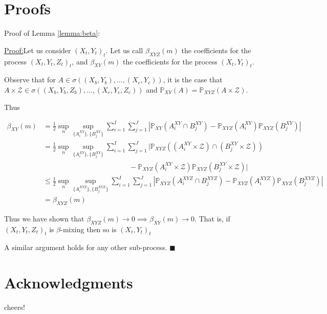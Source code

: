 \documentclass{article}
\newenvironment{claimproof}[1]{\par\noindent\underline{Proof:}\space#1}{\hfill $\blacksquare$}
\begin{document}
\section{Proofs}
Proof of Lemma \ref{lemma:beta}:
\begin{claimproof} Let us consider $(X_t,Y_t)_t$.
Let us call $\beta_{XYZ}(m)$ the coefficients for the process $(X_t,Y_t,Z_t)_t$, and $\beta_{XY}(m)$ the coefficients for the process $(X_t,Y_t)_t$. 

Observe that for $A \in \sigma((X_b,Y_b),\ldots, (X_c,Y_c))$, it is the case that $A \times \mathcal{Z} \in \sigma((X_b,Y_b,Z_b),\ldots, (X_c,Y_c,Z_c))$ and $\mathbb{P}_{XY}(A) = \mathbb{P}_{XYZ}(A\times \mathcal{Z})$.

Thus

\begin{align*}
\beta_{XY}(m) &= \frac{1}{2} \sup_n \sup_{ \{A_i^{XY} \}, \{B_j^{XY} \} } \sum_{i=1}^I \sum_{j=1}^J | \mathbb{P}_{XY}(A_i^{XY} \cap B_j^{XY}) - \mathbb{P}_{XYZ}(A_i^{XY})\mathbb{P}_{XYZ}(B_j^{XY})| \\
&= \frac{1}{2} \sup_n \sup_{ \{A_i^{XY} \}, \{B_j^{XY} \} } \sum_{i=1}^I \sum_{j=1}^J | \mathbb{P}_{XYZ}((A_i^{XY}\times \mathcal{Z}) \cap (B_j^{XY} \times \mathcal{Z})) \\& \quad \quad\quad \quad \quad \quad\quad \quad \quad \quad\quad \quad- \mathbb{P}_{XYZ}(A_i^{XY}\times \mathcal{Z})\mathbb{P}_{XYZ}(B_j^{XY} \times \mathcal{Z})| \\
& \leq \frac{1}{2} \sup_n \sup_{ \{A_i^{XYZ} \}, \{B_j^{XYZ} \} } \sum_{i=1}^I \sum_{j=1}^J | \mathbb{P}_{XYZ}(A_i^{XYZ} \cap B_j^{XYZ}) - \mathbb{P}_{XYZ}(A_i^{XYZ})\mathbb{P}_{XYZ}(B_j^{XYZ})| \\
& = \beta_{XYZ}(m)
\end{align*}

Thus we have shown that  $\beta_{XYZ}(m) \longrightarrow 0 \implies \beta_{XY}(m) \longrightarrow 0$. That is, if  $(X_t,Y_t,Z_t)_t$ is $\beta$-mixing then so is  $(X_t,Y_t)_t$ 

A similar argument holds for any other sub-process.
\end{claimproof}

\section*{Acknowledgments} 
cheers!


\end{document}
